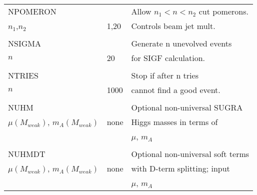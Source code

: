 \begin{center}
\begin{tabular}{lll}
NPOMERON               &                   & Allow $n_1<n<n_2$ cut pomerons.\\
$n_1$,$n_2$            & 1,20              & Controls beam jet mult.        \\
                       &                   &                                \\
NSIGMA                 &                   & Generate n unevolved events    \\
$n$                    & 20                & for SIGF calculation.          \\
                       &                   &                                \\
NTRIES                 &                   & Stop if after n tries          \\
$n$                    & 1000              & cannot find a good event.      \\
                       &                   &                                \\
NUHM                   &                   & Optional non-universal SUGRA   \\
$\mu (M_{weak})$, $m_A(M_{weak})$ & none   & Higgs masses in terms of       \\
                       &                   & $\mu$, $m_A$                   \\
                       &                   &                                \\
NUHMDT                 &                   & Optional non-universal soft terms \\
$\mu (M_{weak})$, $m_A(M_{weak})$ & none      & with D-term splitting; input  \\
                       &                   & $\mu$, $m_A$                   \\
\hline\hline
\end{tabular}
\end{center}

